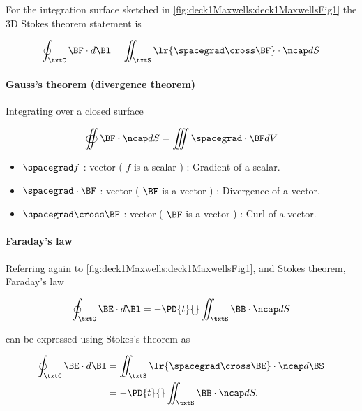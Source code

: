 For the integration surface sketched in \cref{fig:deck1Maxwells:deck1MaxwellsFig1} the 3D Stokes theorem statement is

\begin{equation}\label{eqn:uwavesLecture1:140}
\oint_\txtC \BF \cdot d\Bl = \iint_\txtS \lr{ \spacegrad \cross \BF } \cdot \ncap dS
\end{equation}

\paragraph{Gauss's theorem (divergence theorem)}

Integrating over a closed surface

\begin{equation}\label{eqn:uwavesLecture1:160}
\oiint \BF \cdot \ncap dS = \iiint \spacegrad \cdot \BF dV
\end{equation}

\begin{itemize}
\item \( \spacegrad f \) :  vector ( \( f \) is a scalar ) : Gradient of a scalar.
\item \( \spacegrad \cdot \BF \) :  vector ( \( \BF \) is a vector ) : Divergence of a vector.
\item \( \spacegrad \cross \BF \) :  vector ( \( \BF \) is a vector ) : Curl of a vector.
\end{itemize}

\paragraph{Faraday's law}

Referring again to \cref{fig:deck1Maxwells:deck1MaxwellsFig1}, and Stokes theorem, Faraday's law

\begin{equation}\label{eqn:uwavesLecture1:180}
\oint_\txtC \BE \cdot d\Bl = - \PD{t}{} \iint_\txtS \BB \cdot \ncap dS
\end{equation}

can be expressed using Stokes's theorem as

\begin{equation}\label{eqn:uwavesLecture1:200}
\begin{aligned}
\oint_\txtC \BE \cdot d\Bl &= \iint_\txtS \lr{ \spacegrad \cross \BE} \cdot \ncap d\BS
\\ &=
- \PD{t}{} \iint_\txtS \BB \cdot \ncap dS.
\end{aligned}
\end{equation}

